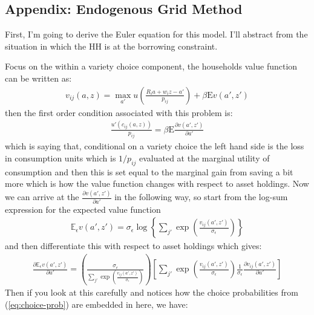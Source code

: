 \documentclass[12pt,pdftex]{article}
\begin{document}
\begin{onehalfspacing}
{}





\newpage


\section{Appendix: Endogenous Grid Method}

First, I'm going to derive the Euler equation for this model. I'll abstract from the situation in which the HH is at the borrowing constraint.

Focus on the within a variety choice component, the households value function can be written as:
\begin{align}
v_{ij}(a, z) = \max_{a'} u \left( \frac{R_i a + w_i z - a'}{p_{ij}} \right) + \beta  \mathrm{E} v(a', z')
\end{align}
then the first order condition associated with this problem is:
\begin{align}
\frac{u'(c_{ij}(a, z))}{p_{ij}} = \beta \mathrm{E} \frac{\partial v(a', z')}{\partial a'}
\end{align}
which is saying that, conditional on a variety choice the left hand side is the loss in consumption units which is $1 / p_{ij}$ evaluated at the marginal utility of consumption and then this is set equal to the marginal gain from saving a bit more which is how the value function changes with respect to asset holdings. Now we can arrive at the $\frac{\partial v(a', z')}{\partial a'}$ in the following way, so start from the log-sum expression for the expected value function
\begin{align}
\mathbb{E}_{\epsilon} v(a', z') =  \sigma_{\epsilon} \log \left\{ \sum_{j'} \exp \left( \frac{  v_{ij}(a', z')}{\sigma_{\epsilon}} \right) \right\}
\end{align}
and then differentiate this with respect to asset holdings which gives:
\begin{align}
\frac{\partial \mathbb{E}_{\epsilon} v(a', z')}{\partial a'} = \left( \frac{\sigma_{\epsilon}}{\sum_{j'} \exp \left( \frac{  v_{ij}(a', z')}{\sigma_{\epsilon}}\right)} \right)
\left[ \sum_{j'} \exp \left( \frac{  v_{ij}(a', z')}{\sigma_{\epsilon}}\right) \frac{1}{\sigma_{\epsilon}} \frac{\partial v_{ij}(a', z')}{\partial a'}  \right]
\end{align}
Then if you look at this carefully and notices how the choice probabilities from (\ref{eq:choice-prob}) are embedded in here, we have:
\begin{align}

\end{align}
\end{onehalfspacing}
\end{document}
